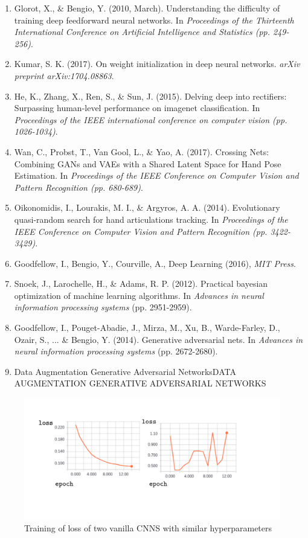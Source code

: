 \documentclass{article}
\begin{document}
\begin{enumerate}
\item Glorot, X., \& Bengio, Y. (2010, March). Understanding the difficulty of training deep feedforward neural networks. In \emph{ Proceedings of the Thirteenth International Conference on Artificial Intelligence and Statistics (pp. 249-256)}.
\item Kumar, S. K. (2017). On weight initialization in deep neural networks. \emph{arXiv preprint arXiv:1704.08863}.
\item He, K., Zhang, X., Ren, S., \& Sun, J. (2015). Delving deep into rectifiers: Surpassing human-level performance on imagenet classification. In \emph{Proceedings of the IEEE international conference on computer vision (pp. 1026-1034)}.
\item Wan, C., Probst, T., Van Gool, L., \& Yao, A. (2017). Crossing Nets: Combining GANs and VAEs with a Shared Latent Space for Hand Pose Estimation. In \emph{Proceedings of the IEEE Conference on Computer Vision and Pattern Recognition (pp. 680-689)}.
\item Oikonomidis, I., Lourakis, M. I., \& Argyros, A. A. (2014). Evolutionary quasi-random search for hand articulations tracking. In \emph{Proceedings of the IEEE Conference on Computer Vision and Pattern Recognition (pp. 3422-3429)}.
\item Goodfellow, I., Bengio, Y., Courville, A., Deep Learning (2016), \emph{MIT Press}.
\item Snoek, J., Larochelle, H., \& Adams, R. P. (2012). Practical bayesian optimization of machine learning algorithms. In \emph{Advances in neural information processing systems} (pp. 2951-2959).
\item Goodfellow, I., Pouget-Abadie, J., Mirza, M., Xu, B., Warde-Farley, D., Ozair, S., ... \& Bengio, Y. (2014). Generative adversarial nets. In \emph{Advances in neural information processing systems} (pp. 2672-2680).
\item Data Augmentation Generative Adversarial NetworksDATA AUGMENTATION GENERATIVE ADVERSARIAL
NETWORKS
\end{enumerate}

\begin{figure}[h]
  \includegraphics[width=\linewidth]{loss.pdf}
  \caption{Training of loss of two vanilla CNNS with similar hyperparameters}
  \label{fig:loss}
\end{figure}
\end{document}
